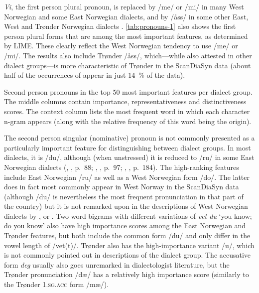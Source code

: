 \textit{Vi}, the first person plural pronoun, is replaced by /me/ or /mi/ in many West Norwegian and some East Norwegian dialects, and by /{\aa}ss/ in some other East, West and Trønder Norwegian dialects \cite[p.~183]{maehlum2012dialektlandskapet}.
\autoref{tab:pronouns-1} also shows the first person plural forms that are among the most important features, as determined by LIME.
These clearly reflect the West Norwegian tendency to use /me/ or /mi/.
The results also include Tr\o{}nder /åss/, which---while also attested in other dialect groups---is more characteristic of Tr\o{}nder in the ScanDiaSyn data (about half of the occurrences of  appear in just 14~\% of the data).

\begin{table}[htbp]
    
    \caption[Second person pronouns in the top 50 most important features per dialect group]
    {Second person pronouns in the top 50 most important features per dialect group.
    The middle columns contain importance, representativeness and distinctiveness scores.
    The context column lists the most frequent word in which each character n-gram appears (along with the relative frequency of this word being the origin).}
    \label{tab:pronouns-2}
\end{table}


The second person singular (nominative) pronoun is not commonly presented as a particularly important feature for distinguishing between dialect groups.
In most dialects, it is /du/, although (when unstressed) it is reduced to /ru/ in some East Norwegian dialects (\citeauthor{haarstad2013spraak}, \citeyear{haarstad2013spraak}, p.~88; \citeauthor{endresen1990vikvaersk}, \citeyear{endresen1990vikvaersk}, p.~97; \citeauthor{wiggen1990oslo}, \citeyear{wiggen1990oslo}, p.~184).
The high-ranking features include East Norwegian /ru/ as well as a West Norwegian form /do/.
The latter does in fact most commonly appear in West Norway in the ScanDiaSyn data (although /du/ is nevertheless the most frequent pronunciation in that part of the country) but it is not remarked upon in the descriptions of West Norwegian dialects by \citet{sandoey1996vestlandet}, \citet[pp.~168, 176, 185]{hanssen2010dialekter} or \citet[p.~91]{maehlum2012dialektlandskapet}.
Two word bigrams with different variations of \textit{vet du} `you know; do you know' also have high importance scores among the East Norwegian and Tr\o{}nder features, but both include the common form /du/ and only differ in the vowel length of /vet(t)/.
Tr\o{}nder also has the high-importance variant /u/, which is not commonly pointed out in descriptions of the dialect group.
The accusative form \textit{deg} usually also goes unremarked in dialectologist literature, but the Trønder pronunciation /d\ae/ has a relatively high importance score (similarly to the Trønder \textsc{1.sg.acc} form /m\ae/).

